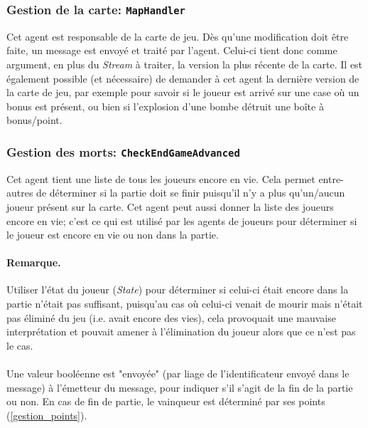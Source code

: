 \documentclass{article}
\begin{document}
\subsubsection{Gestion de la carte: \texttt{MapHandler}}
\label{gestion_map}
Cet agent est responsable de la carte de jeu. Dès qu'une modification doit être faite, un message est envoyé et traité par l'agent. Celui-ci tient donc comme argument, en plus du \emph{Stream} à traiter, la version la plus récente de la carte. Il est également possible (et nécessaire) de demander à cet agent la dernière version de la carte de jeu, par exemple pour savoir si le joueur est arrivé sur une case où un bonus est présent, ou bien si l'explosion d'une bombe détruit une boîte à bonus/point.
\subsubsection{Gestion des morts: \texttt{CheckEndGameAdvanced}}
\label{gestion_morts}
Cet agent tient une liste de tous les joueurs encore en vie. Cela permet entre-autres de déterminer si la partie doit se finir puisqu'il n'y a plus qu'un/aucun joueur présent sur la carte. Cet agent peut aussi donner la liste des joueurs encore en vie; c'est ce qui est utilisé par les agents de joueurs pour déterminer si le joueur est encore en vie ou non dans la partie.
\paragraph{Remarque.}Utiliser l'état du joueur (\emph{State}) pour déterminer si celui-ci était encore dans la partie n'était pas suffisant, puisqu'au cas où celui-ci venait de mourir mais n'était pas éliminé du jeu (i.e. avait encore des vies), cela provoquait une mauvaise interprétation et pouvait amener à l'élimination du joueur alors que ce n'est pas le cas.\\ \\
Une valeur booléenne est "envoyée" (par liage de l'identificateur envoyé dans le message) à l'émetteur du message, pour indiquer s'il s'agit de la fin de la partie ou non. En cas de fin de partie, le vainqueur est déterminé par ses points (\ref{gestion_points}).
\end{document}
